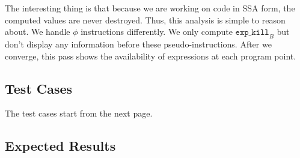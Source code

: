 The interesting thing is that because we are working on code in SSA form, the computed values are never
destroyed. Thus, this analysis is simple to reason about.
We handle $\phi$ instructions differently. We only compute $\texttt{exp\_kill}_{B}$ but don't display any
information before these pseudo-instructions.
After we converge, this pass shows the availability of expressions at each program point.



%

\subsection{Test Cases}

The test cases start from the next page.



\subsection{Expected Results}

